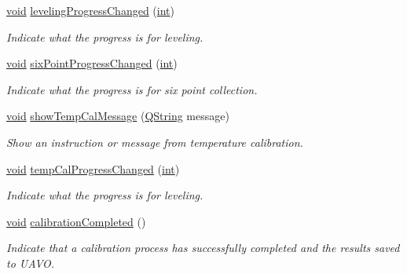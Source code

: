 \begin{DoxyCompactItemize}
\hyperlink{group___u_a_v_objects_plugin_ga444cf2ff3f0ecbe028adce838d373f5c}{void} \hyperlink{class_calibration_a34770d5a2df9d4dd5e5845c8c0633a63}{leveling\-Progress\-Changed} (\hyperlink{ioapi_8h_a787fa3cf048117ba7123753c1e74fcd6}{int})
\begin{DoxyCompactList}\small\item\em Indicate what the progress is for leveling. \end{DoxyCompactList}\item 
\hyperlink{group___u_a_v_objects_plugin_ga444cf2ff3f0ecbe028adce838d373f5c}{void} \hyperlink{class_calibration_a147fed7878b2ce2578f912e377447cc8}{six\-Point\-Progress\-Changed} (\hyperlink{ioapi_8h_a787fa3cf048117ba7123753c1e74fcd6}{int})
\begin{DoxyCompactList}\small\item\em Indicate what the progress is for six point collection. \end{DoxyCompactList}\item 
\hyperlink{group___u_a_v_objects_plugin_ga444cf2ff3f0ecbe028adce838d373f5c}{void} \hyperlink{class_calibration_a6d1fe12509a4d29e08cb8d76e7d81b20}{show\-Temp\-Cal\-Message} (\hyperlink{group___u_a_v_objects_plugin_gab9d252f49c333c94a72f97ce3105a32d}{Q\-String} message)
\begin{DoxyCompactList}\small\item\em Show an instruction or message from temperature calibration. \end{DoxyCompactList}\item 
\hyperlink{group___u_a_v_objects_plugin_ga444cf2ff3f0ecbe028adce838d373f5c}{void} \hyperlink{class_calibration_a7d28d53212a12e83b021eb3d32e06bcd}{temp\-Cal\-Progress\-Changed} (\hyperlink{ioapi_8h_a787fa3cf048117ba7123753c1e74fcd6}{int})
\begin{DoxyCompactList}\small\item\em Indicate what the progress is for leveling. \end{DoxyCompactList}\item 
\hyperlink{group___u_a_v_objects_plugin_ga444cf2ff3f0ecbe028adce838d373f5c}{void} \hyperlink{class_calibration_a4e681ad78dc398b52b137dad1fe8e18b}{calibration\-Completed} ()
\begin{DoxyCompactList}\small\item\em Indicate that a calibration process has successfully completed and the results saved to U\-A\-V\-O. \end{DoxyCompactList}\end{DoxyCompactItemize}
